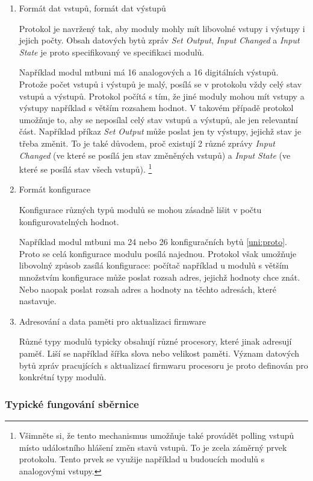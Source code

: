 \begin{enumerate}
\item Formát dat vstupů, formát dat výstupů

Protokol je navržený tak, aby moduly mohly mít libovolné vstupy i výstupy
i jejich počty. Obsah datových bytů zpráv \textit{Set Output}, \textit{Input
Changed} a \textit{Input State} je proto specifikovaný ve specifikaci modulů.

Například modul \gls{mtbuni} má 16 analogových a 16 digitálních výstupů.
Protože počet vstupů i výstupů je malý, posílá se v protokolu vždy celý stav
vstupů a výstupů. Protokol počítá s tím, že jiné moduly mohou mít vstupy a
výstupy například s větším rozsahem hodnot. V takovém případě protokol umožňuje
to, aby se neposílal celý stav vstupů a výstupů, ale jen relevantní část.
Například příkaz \textit{Set Output} může poslat jen ty výstupy, jejichž
stav je třeba změnit. To je také důvodem, proč existují 2 různé zprávy
\textit{Input Changed} (ve které se posílá jen stav změněných vstupů) a
\textit{Input State} (ve které se posílá stav všech vstupů).
\footnote{Všimněte si, že tento mechanismus umožňuje také provádět polling
vstupů místo událostního hlášení změn stavů vstupů. To je zcela záměrný prvek
protokolu. Tento prvek se využije například u budoucích modulů s analogovými
vstupy.}

\item Formát konfigurace

Konfigurace různých typů modulů se mohou zásadně lišit v počtu
konfigurovatelných hodnot.

Například modul \gls{mtbuni} ma 24 nebo 26 konfiguračních bytů
\ref{uni:proto}. Proto se celá konfigurace modulu posílá najednou.  Protokol
však umožňuje libovolný způsob zasílá konfigurace: počítač například u modulů s
větším množstvím konfigurace může poslat rozsah adres, jejichž hodnoty chce
znát. Nebo naopak poslat rozsah adres a hodnoty na těchto adresách, které
nastavuje.

\item Adresování a data paměti pro aktualizaci firmware

Různé typy modulů typicky obsahují různé procesory, které jinak adresují paměť.
Liší se například šířka slova nebo velikost paměti. Význam datových bytů
zpráv pracujících s aktualizací firmwaru procesoru je proto definován pro
konkrétní typy modulů.

\end{enumerate}

\subsubsection{Typické fungování sběrnice}

